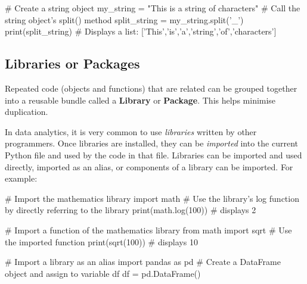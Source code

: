 \begin{pycode}
    # Create a string object
    my_string = "This is a string of characters"
    # Call the string object's split() method
    split_string = my_string.split('_')
    print(split_string) 
    # Displays a  list: ['This','is','a','string','of','characters']
\end{pycode}

\subsection{Libraries or Packages}

Repeated code (objects and functions) that are related can be grouped together into a reusable bundle called a \textbf{Library} or \textbf{Package}. This helps minimise duplication.

In data analytics, it is very common to use \textit{libraries} written by other programmers. Once libraries are installed, they can be \textit{imported} into the current Python file and used by the code in that file. Libraries can be imported and used directly, imported as an alias, or components of a library can be imported. For example:

\begin{pycode}
    # Import the mathematics library
    import math
    # Use the library's log function by directly referring to the library
    print(math.log(100)) # displays 2

    # Import a function of the mathematics library
    from math import sqrt
    # Use the imported function
    print(sqrt(100)) # displays 10

    # Import a library as an alias
    import pandas as pd
    # Create a DataFrame object and assign to variable df
    df = pd.DataFrame()
\end{pycode}